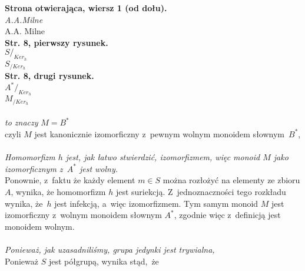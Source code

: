 \documentclass[a4paper,11pt]{article}
\begin{document}
\vspace{\spaceTwo}


\noindent
\textbf{Strona otwierająca, wiersz 1 (od dołu).} \\
\Jest  \textit{A.A.Milne} \\
\Powin A.A. Milne \\
\textbf{Str. 8, pierwszy rysunek.} \\
\Jest  $S /_{ Ker_{ h } }$ \\
\Powin $S_{ / Ker_{ h } }$ \\
\textbf{Str. 8, drugi rysunek.} \\
\Jest  $A^{ * } /_{ Ker_{ h } }$ \\
\Powin $M_{ / Ker_{ h } }$ \\
 \\
\Jest  \textit{to znaczy} $M = B^{ * }$ \\
\Powin czyli $M$ jest kanonicznie izomorficzny z~pewnym wolnym monoidem
słownym~$B^{ * }$, \\
 \\
\Jest  \textit{Homomorfizm $h$ jest, jak łatwo stwierdzić, izomorfizmem,
  więc monoid $M$ jako izomorficznym z~$A^{ * }$ jest wolny.} \\
\Powin Ponownie, z~faktu że każdy element $m \in S$ można rozłożyć na
  elementy ze zbioru $A$, wynika, że homomorfizm $h$ jest suriekcją.
  Z~jednoznaczności tego rozkładu wynika, że~$h$ jest infekcją, a~więc
  izomorfizmem. Tym samym monoid $M$ jest izomorficzny z~wolnym monoidem
  słownym $A^{ * }$, zgodnie więc z~definicją jest monoidem wolnym. \\
 \\
\Jest  \textit{Ponieważ, jak uzasadniliśmy, grupa jedynki jest trywialna,}
\\
\Powin Ponieważ $S$ jest półgrupą, wynika stąd,~że \\




















{}






\end{document}
